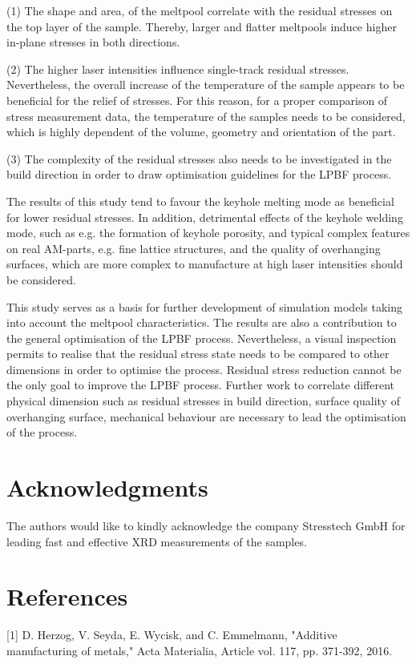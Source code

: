 \documentclass[10pt]{article}
\begin{document}
(1) The shape and area, of the meltpool correlate with the residual stresses on the top layer of the sample. Thereby, larger and flatter meltpools induce higher in-plane stresses in both directions.

(2) The higher laser intensities influence single-track residual stresses. Nevertheless, the overall increase of the temperature of the sample appears to be beneficial for the relief of stresses. For this reason, for a proper comparison of stress measurement data, the temperature of the samples needs to be considered, which is highly dependent of the volume, geometry and orientation of the part.

(3) The complexity of the residual stresses also needs to be investigated in the build direction in order to draw optimisation guidelines for the LPBF process.

The results of this study tend to favour the keyhole melting mode as beneficial for lower residual stresses. In addition, detrimental effects of the keyhole welding mode, such as e.g. the formation of keyhole porosity, and typical complex features on real AM-parts, e.g. fine lattice structures, and the quality of overhanging surfaces, which are more complex to manufacture at high laser intensities should be considered.

This study serves as a basis for further development of simulation models taking into account the meltpool characteristics. The results are also a contribution to the general optimisation of the LPBF process. Nevertheless, a visual inspection permits to realise that the residual stress state needs to be compared to other dimensions in order to optimise the process. Residual stress reduction cannot be the only goal to improve the LPBF process. Further work to correlate different physical dimension such as residual stresses in build direction, surface quality of overhanging surface, mechanical behaviour are necessary to lead the optimisation of the process.

\section*{Acknowledgments}
The authors would like to kindly acknowledge the company Stresstech GmbH for leading fast and effective XRD measurements of the samples.

\section*{References}
[1] D. Herzog, V. Seyda, E. Wycisk, and C. Emmelmann, "Additive manufacturing of metals," Acta Materialia, Article vol. 117, pp. 371-392, 2016.
\end{document}

